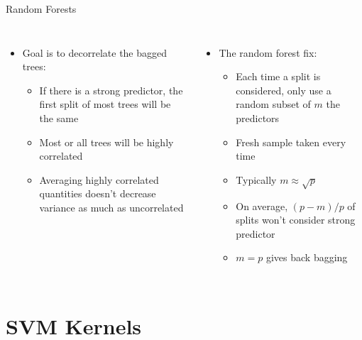 \documentclass[aspectratio=169,usenames,dvipsnames]{beamer}
\begin{document}
\begin{frame}[t]{Random Forests}

\begin{columns}
\centering
\begin{itemize}
	\item Goal is to decorrelate the bagged trees:
	\begin{itemize}
		\item If there is a strong predictor, the first split of most trees will be the same
		\item Most or all trees will be highly correlated
		\item Averaging highly correlated quantities doesn't decrease variance as much as uncorrelated
	\end{itemize}
\end{itemize}
\centering
\begin{itemize}
	\item The random forest fix:
	\begin{itemize}
		\item Each time a split is considered, only use a random subset of $m$ the predictors
		\item Fresh sample taken every time
		\item Typically $m \approx \sqrt p$
		\item On average, $(p-m)/p$ of splits won't consider strong predictor
		\item $m = p$ gives back bagging
	\end{itemize}
\end{itemize}
\end{columns}

\end{frame}



\section{SVM Kernels}
\end{document}
